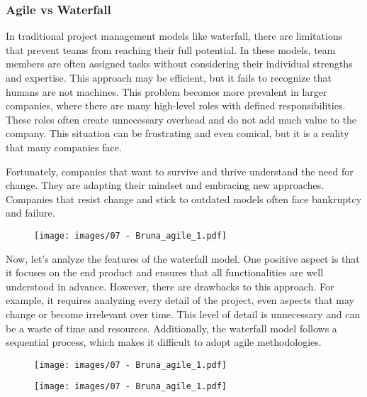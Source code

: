 \subsubsection{Agile vs Waterfall}

In traditional project management models like waterfall, there are
limitations that prevent teams from reaching their full potential. In
these models, team members are often assigned tasks without considering
their individual strengths and expertise. This approach may be
efficient, but it fails to recognize that humans are not machines. This
problem becomes more prevalent in larger companies, where there are many
high-level roles with defined responsibilities. These roles often create
unnecessary overhead and do not add much value to the company. This
situation can be frustrating and even comical, but it is a reality that
many companies face.

Fortunately, companies that want to survive and thrive understand the
need for change. They are adapting their mindset and embracing new
approaches. Companies that resist change and stick to outdated models
often face bankruptcy and failure.

\begin{figure}[!h]
    \centering
    \texttt{[image: images/07 - Bruna\_agile\_1.pdf]}
\end{figure}

Now, let's analyze the features of the waterfall model. One positive
aspect is that it focuses on the end product and ensures that all
functionalities are well understood in advance. However, there are
drawbacks to this approach. For example, it requires analyzing every
detail of the project, even aspects that may change or become irrelevant
over time. This level of detail is unnecessary and can be a waste of
time and resources. Additionally, the waterfall model follows a
sequential process, which makes it difficult to adopt agile
methodologies.

\begin{figure}[!h]
    \centering
    \texttt{[image: images/07 - Bruna\_agile\_1.pdf]}
\end{figure}

\begin{figure}[!h]
    \centering
    \texttt{[image: images/07 - Bruna\_agile\_1.pdf]}
\end{figure}

